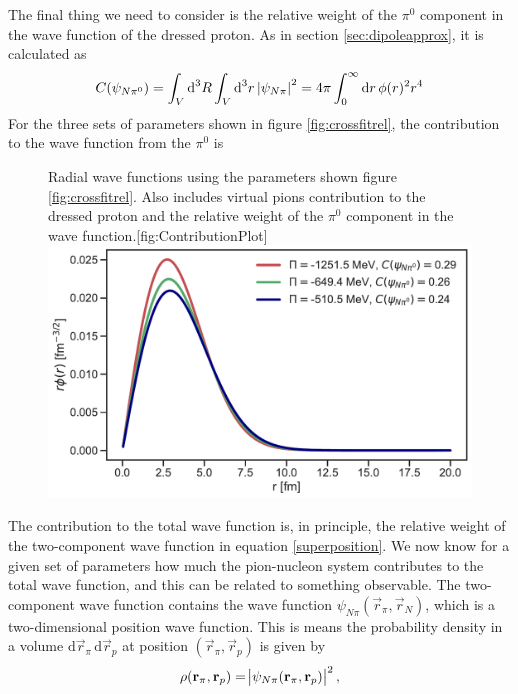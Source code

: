 The final thing we need to consider is the relative weight of the $\pi^0$ component in the wave function of the dressed proton. As in section \ref{sec:dipoleapprox}, it is calculated as 
\begin{equation}
	C(\psi_{N\pi^0})= \int_V \text{d}^3R \int_V \text{d}^3 r \, \abs{\psi_{N\pi}}^2 = 4\pi \int_0^\infty \text{d}r \, \phi(r)^2r^4
\end{equation}
For the three sets of parameters shown in figure \ref{fig:crossfitrel}, the contribution to the wave function from the $\pi^0$ is
\begin{figure}[H]
	\begin{sidecaption}{Radial wave functions using the parameters shown figure \ref{fig:crossfitrel}. Also includes virtual pions contribution to the dressed proton and the relative weight of the $\pi^0$ component in the wave function.}[fig:ContributionPlot]
		\includegraphics[width=\linewidth]{Figures/ContributionPlot.pdf} 
	\end{sidecaption}
\end{figure}
The contribution to the total wave function is, in principle, the relative weight of the two-component wave function in equation \eqref{superposition}. We now know for a given set of parameters how much the pion-nucleon system contributes to the total wave function, and this can be related to something observable. The two-component wave function contains the wave function $\psi_{N\pi}(\vec{r}_\pi,\vec{r}_N)$, which is a two-dimensional position wave function. This is means the probability density in a volume $\text{d}\vec{r}_\pi \, \text{d}\vec{r}_p$ at position $(\vec{r}_\pi,\vec{r}_p)$ is given by
\begin{equation}\label{probdens}
	\rho(\bm{\mathrm{r}}_\pi,\bm{\mathrm{r}}_p) = \abs{\psi_{N\pi}(\bm{\mathrm{r}}_\pi,\bm{\mathrm{r}}_p)}^2,
\end{equation}
